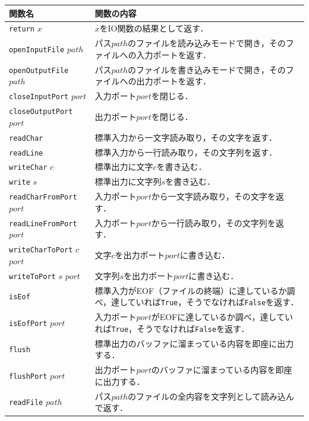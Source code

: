 \begin{table}[h]
  \begin{center}
    \begin{tabular}{ | l | p{9.5cm} |}
    \hline
    関数名 & 関数の内容 \\ \hline
    \texttt{return} $x$ & $x$をIO関数の結果として返す． \\ \hline
    \texttt{openInputFile} $path$ & パス$path$のファイルを読み込みモードで開き，そのファイルへの入力ポートを返す． \\ \hline
    \texttt{openOutputFile} $path$ & パス$path$のファイルを書き込みモードで開き，そのファイルへの出力ポートを返す． \\ \hline
    \texttt{closeInputPort} $port$ & 入力ポート$port$を閉じる． \\ \hline
    \texttt{closeOutputPort} $port$ & 出力ポート$port$を閉じる． \\ \hline
    \texttt{readChar} & 標準入力から一文字読み取り，その文字を返す． \\ \hline
    \texttt{readLine} & 標準入力から一行読み取り，その文字列を返す． \\ \hline
    \texttt{writeChar} $c$ & 標準出力に文字$c$を書き込む． \\ \hline
    \texttt{write} $s$ & 標準出力に文字列$s$を書き込む． \\ \hline
    \texttt{readCharFromPort} $port$ & 入力ポート$port$から一文字読み取り，その文字を返す． \\ \hline
    \texttt{readLineFromPort} $port$ & 入力ポート$port$から一行読み取り，その文字列を返す． \\ \hline
    \texttt{writeCharToPort} $c$ $port$ & 文字$c$を出力ポート$port$に書き込む． \\ \hline
    \texttt{writeToPort} $s$ $port$ & 文字列$s$を出力ポート$port$に書き込む． \\ \hline
    \texttt{isEof} & 標準入力がEOF（ファイルの終端）に達しているか調べ，達していれば\texttt{True}，そうでなければ\texttt{False}を返す． \\ \hline
    \texttt{isEofPort} $port$ & 入力ポート$port$がEOFに達しているか調べ，達していれば\texttt{True}，そうでなければ\texttt{False}を返す． \\ \hline
    \texttt{flush} & 標準出力のバッファに溜まっている内容を即座に出力する． \\ \hline
    \texttt{flushPort} $port$ & 出力ポート$port$のバッファに溜まっている内容を即座に出力する． \\ \hline
    \texttt{readFile} $path$ & パス$path$のファイルの全内容を文字列として読み込んで返す． \\ \hline

\end{tabular}
\end{center}
\end{table}
